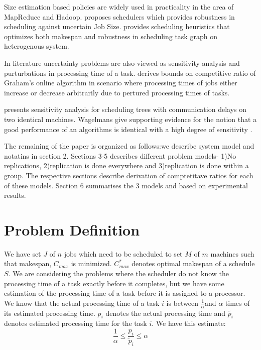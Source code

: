 \documentclass[10pt, conference, compsocconf]{IEEEtran}
\begin{document}
Size estimation based policies are widely used in practicality in the area of MapReduce and Hadoop. \cite{IEEEhowto:Wolf} \cite{IEEEhowto:Pastorelli} proposes schedulers which provides robustness in scheduling against uncertain Job Size. \cite{IEEEhowto:Canon} provides scheduling heuristics that optimizes both makespan and robustness in scheduling task graph on heterogenous system.

In literature uncertainty problems are also viewed as sensitivity analysis and purturbations in processing time of a task. \cite{IEEEhowto:Gatto} derives bounds on competitive ratio of Graham’s online algorithm in scenario where processing times of jobs either increase or decrease arbitrarily due to pertured processing times of tasks.

\cite{IEEEhowto:Guinand} presents sensitivity analysis for scheduling trees with communication
delays on two identical machines.  Wagelmans give supporting evidence for the notion  that a good performance of an algorithms  is identical with a high degree of sensitivity \cite{IEEEhowto:Wagelmans}. 

The remaining of the paper is organized as follows:we describe system model and notatins in section 2. Sections 3-5 describes different problem models- 1)No replications, 2)replication is done everywhere and 3)replication is done within a group. The respective sections describe derivation of comptetitave ratios for each of these models. Section 6 summarises the 3 models and based on experimental results.  

\section{Problem Definition}
We have set $J$ of $n$ jobs which need to be scheduled to set $M$ of $m$ machines such that makespan, $C_{max}$ is minimized.   $C_{max}^{*}$ denotes optimal makespan of a schedule $S$.   We are considering the problems where the scheduler do not know the processing time of a task exactly before it completes, but we have some estimation of the processing time of a task before it is  assigned to a processor. We know that the actual processing time of a task $i$ is between $\frac{1}{\alpha}$and $\alpha$ times of its estimated processing time. $p_i$ denotes the actual processing time and $\tilde {p_i}$ denotes
estimated processing time for the task $i$.  We have this estimate:\\
\begin{equation} 
\frac{1}{\alpha}\leq \frac{p_{i}}{\tilde{p}_{i}}\leq \alpha
\end{equation}\\
\end{document}
